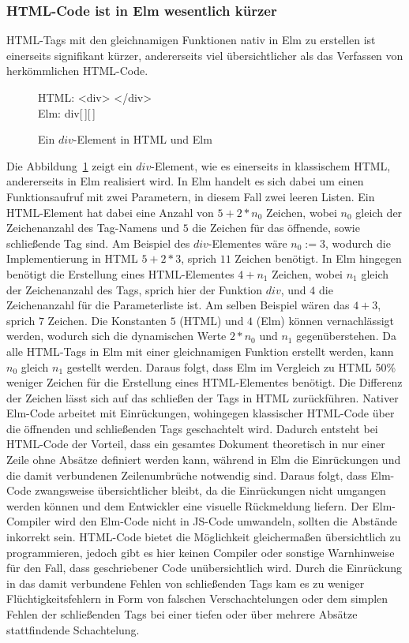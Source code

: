 \subsubsection{HTML-Code ist in Elm wesentlich kürzer}
\ac{HTML}-Tags mit den gleichnamigen Funktionen nativ in Elm zu erstellen ist einerseits signifikant kürzer, andererseits viel übersichtlicher als das Verfassen von herkömmlichen \ac{HTML}-Code.
\begin{figure}[h]
\centering
HTML:
<div>
</div>\\
Elm:
div[$\,$][$\,$]
\caption{Ein $div$-Element in \ac{HTML} und Elm}\label{fig:div-element}
\end{figure}
Die Abbildung~\ref{fig:div-element} zeigt ein $div$-Element, wie es einerseits in klassischem \ac{HTML}, andererseits in Elm realisiert wird. In Elm handelt es sich dabei um einen Funktionsaufruf mit zwei Parametern, in diesem Fall zwei leeren Listen. Ein \ac{HTML}-Element hat dabei eine Anzahl von $5+2*n_0$ Zeichen, wobei $n_0$ gleich der Zeichenanzahl des Tag-Namens und $5$ die Zeichen für das öffnende, sowie schließende Tag sind. Am Beispiel des $div$-Elementes wäre $n_0:=3$, wodurch die Implementierung in \ac{HTML} $5+2*3$, sprich $11$ Zeichen benötigt.
In Elm hingegen benötigt die Erstellung eines \ac{HTML}-Elementes $4+n_1$ Zeichen, wobei $n_1$ gleich der Zeichenanzahl des Tags, sprich hier der Funktion $div$, und $4$ die Zeichenanzahl für die Parameterliste ist. Am selben Beispiel wären das $4+3$, sprich $7$ Zeichen. Die Konstanten $5$ (\ac{HTML}) und $4$ (Elm) können vernachlässigt werden, wodurch sich die dynamischen Werte $2*n_0$ und $n_1$ gegenüberstehen. Da alle \ac{HTML}-Tags in Elm mit einer gleichnamigen Funktion erstellt werden, kann $n_0$ gleich $n_1$ gestellt werden. Daraus folgt, dass Elm im Vergleich zu \ac{HTML} 50\% weniger Zeichen für die Erstellung eines \ac{HTML}-Elementes benötigt.
Die Differenz der Zeichen lässt sich auf das schließen der Tags in \ac{HTML} zurückführen. Nativer Elm-Code arbeitet mit Einrückungen, wohingegen klassischer \ac{HTML}-Code über die öffnenden und schließenden Tags geschachtelt wird. Dadurch entsteht bei \ac{HTML}-Code der Vorteil, dass ein gesamtes Dokument theoretisch in nur einer Zeile ohne Absätze definiert werden kann, während in Elm die Einrückungen und die damit verbundenen Zeilenumbrüche notwendig sind. Daraus folgt, dass Elm-Code zwangsweise übersichtlicher bleibt, da die Einrückungen nicht umgangen werden können und dem Entwickler eine visuelle Rückmeldung liefern. Der Elm-Compiler wird den Elm-Code nicht in \ac{JS}-Code umwandeln, sollten die Abstände inkorrekt sein. \ac{HTML}-Code bietet die Möglichkeit gleichermaßen übersichtlich zu programmieren, jedoch gibt es hier keinen Compiler oder sonstige Warnhinweise für den Fall, dass geschriebener Code unübersichtlich wird.
Durch die Einrückung in das damit verbundene Fehlen von schließenden Tags kam es zu weniger Flüchtigkeitsfehlern in Form von falschen Verschachtelungen oder dem simplen Fehlen der schließenden Tags bei einer tiefen oder über mehrere Absätze stattfindende Schachtelung.

